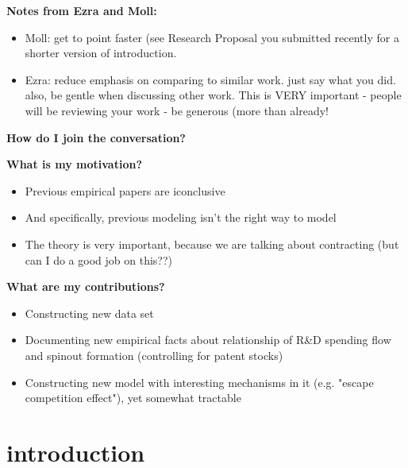 \documentclass[12pt,english]{article}
\theoremstyle{remark}
\begin{document}
\textbf{Notes from Ezra and Moll:}

\begin{itemize}
\item Moll: get to point faster (see Research Proposal you submitted recently for a shorter version of introduction.
\item Ezra: reduce emphasis on comparing to similar work. just say what you did. also, be gentle when discussing other work. This is VERY important - people will be reviewing your work - be generous (more than already!
\end{itemize}

\textbf{How do I join the conversation?}

\textbf{What is my motivation?}

\begin{itemize}
\item Previous empirical papers are iconclusive
\item And specifically, previous modeling isn't the right way to model 
\item The theory is very important, because we are talking about contracting (but can I do a good job on this??)
\end{itemize}

\textbf{What are my contributions?}

\begin{itemize}
\item Constructing new data set
\item Documenting new empirical facts about relationship of R\&D spending flow and spinout formation (controlling for patent stocks)
\item Constructing new model with interesting mechanisms in it (e.g. "escape competition effect"), yet somewhat tractable
\end{itemize}
\section{introduction}
\end{document}
